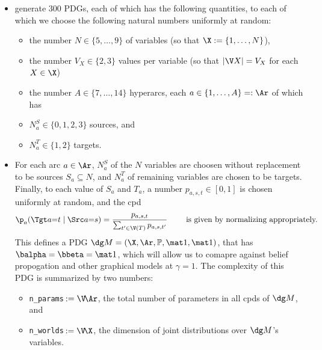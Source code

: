 \begin{itemize}
    \item generate 300 PDGs, each of which has the following quantities, to each of which we choose the following natural numbers uniformly at random:
    \begin{itemize}
        \item the number $N \in \{5,\ldots,9\}$ of variables
            (so that $\X := \{1, \ldots, N\}$),
        \item the number $V_X \in \{2, 3\}$ values per variable
            (so that $|\V X| = V_X$ for each $X \in \X$)
        \item the number $A \in \{7, \ldots, 14\}$ hyperarcs,
        each $a \in \{1, \ldots, A\} =: \Ar$ of which has
        \item $N^S_a \in \{0, 1, 2, 3\}$ sources, and
        \item $N^T_a \in \{1,2\}$ targets.
    \end{itemize}
    \item For each arc $a \in \Ar$, $N^S_a$ of the $N$ variables are choosen without replacement to be sources $S_a \subseteq N$, and $N^T_a$ of remaining variables are chosen to be targets. Finally, to each value of $S_a$ and $T_a$, a number $p_{a,s,t} \in [0,1]$ is chosen uniformly at random, and the cpd 
    \[
     \p_a(\Tgt a {=} t \mid \Src a {=} s) = \frac{p_{a,s,t}}{\sum_{t' \in \V(T)} p_{a,s,t'}}
     \qquad\text{ is given by normalizing appropriately.}
    \]
    This defines a PDG $\dg M = (\X, \Ar, \mathbb P, \mat 1, \mat 1)$, that
    has $\balpha = \bbeta = \mat 1$, which will allow us to comapre against
    belief propogation and other graphical models at $\gamma = 1$.
    The complexity of this PDG is summarized by two numbers:
    \begin{itemize}[nosep]
        \item \texttt{n\_params}$\,:= \V\!\Ar$, the total number of parameters in all cpds of $\dg M$, and
        \item \texttt{n\_worlds}$\,:= \V\!\X$, the dimension of joint distributions over $\dg M$'s variables.
    \end{itemize}
\end{itemize}

